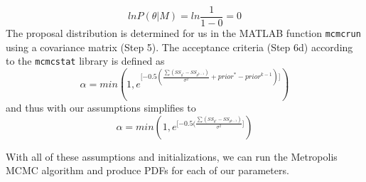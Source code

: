 \begin{equation} \label{eq:14mcmc}
lnP(\theta|M) = ln\frac{1}{1-0} = 0
\end{equation}
The proposal distribution is determined for us in the MATLAB function \texttt{mcmcrun} using a covariance matrix (Step 5). The acceptance criteria (Step 6d) according to the \texttt{mcmcstat} library is defined as
\begin{equation} \label{eq:15mcmc}
\alpha = min(1, e^{ \lbrack {-0.5(\frac{\sum (SS_{\theta^*}-SS_{\theta^{k-1}})}{\sigma^2} + prior^*-prior^{k-1})} \rbrack})
\end{equation}
and thus with our assumptions simplifies to 
\begin{equation} \label{eq:16mcmc}
\alpha = min(1, e^{[ {-0.5(\frac{\sum (SS_{\theta^*}-SS_{\theta^{k-1}})}{\sigma^2}]}})
\end{equation}

With all of these assumptions and initializations, we can run the Metropolis MCMC algorithm and produce PDFs for each of our parameters. 
